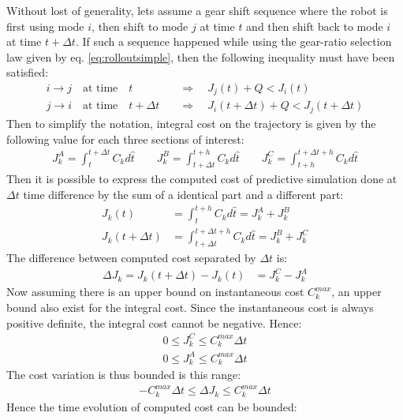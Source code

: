 Without lost of generality, lets assume a gear shift sequence where the robot is first using mode $i$, then shift to mode $j$ at time $t$ and then shift back to mode $i$ at time $t+\Delta t$. If such a sequence happened while using the gear-ratio selection law given by eq. \eqref{eq:rolloutsimple}, then the following inequality must have been satisfied:
%
\begin{align}
i \rightarrow j  \quad\text{at time}\quad t          &\quad\Rightarrow\quad J_j(t) + Q < J_i(t)                  \\
j \rightarrow i  \quad\text{at time}\quad t+\Delta t &\quad\Rightarrow\quad J_i(t+\Delta t) + Q < J_j(t+\Delta t)
\end{align}
%
Then to simplify the notation, integral cost on the trajectory is given by the following value for each three sections of interest:
%
\begin{align}
J_k^A = \int_{t}^{t+\Delta t}{         C_k  d\hat{t}  }   \quad \quad
J_k^B = \int_{t+\Delta t}^{t+h}{       C_k  d\hat{t}  }   \quad \quad
J_k^C = \int_{t+h}^{t+\Delta t+h}{     C_k  d\hat{t}  }
\end{align}
%
Then it is possible to express the computed cost of predictive simulation done at $\Delta t$ time difference by the sum of a identical part and a different part:
%
\begin{align}
J_k(t)          &= \int_{t}^{t+h}{ C_k   d\hat{t} }  = J_k^A + J_k^B \\
J_k(t+\Delta t) &= \int_{t+\Delta t}^{t+\Delta t+h}{   C_k  d\hat{t}} = J_k^B + J_k^C
\end{align}
%
The difference between computed cost separated by $\Delta t$ is:
%
\begin{align}
\Delta J_k = J_k(t+\Delta t) - J_k(t) &= J_k^C - J_k^A
\end{align}
%
Now assuming there is an upper bound on instantaneous cost $C_k^{max}$, an upper bound also exist for the integral cost. Since the instantaneous cost is always positive definite, the integral cost cannot be negative. Hence:
%
\begin{align}
0 \leq J_k^C   \leq  C_k^{max} \Delta t \\
0 \leq J_k^A   \leq  C_k^{max} \Delta t 
\end{align}
%
The cost variation is thus bounded is this range:
%
\begin{align}
-C_k^{max} \Delta t  \leq \Delta J_k \leq C_k^{max} \Delta t
\end{align}
%
Hence the time evolution of computed cost can be bounded:
